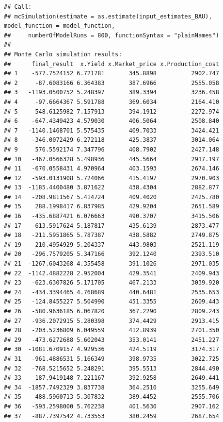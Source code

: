 \documentclass[
]{article}
\begin{document}
\begin{verbatim}
## Call:
## mcSimulation(estimate = as.estimate(input_estimates_BAU), model_function = model_function, 
##     numberOfModelRuns = 800, functionSyntax = "plainNames")
## 
## Monte Carlo simulation results:
##      final_result  x.Yield x.Market_price x.Production_cost
## 1    -577.7524152 6.721781       345.8898          2902.747
## 2     -87.6083166 6.364383       387.6966          2555.058
## 3   -1193.0500752 5.248397       389.3394          3236.458
## 4     -97.6664367 5.591788       369.6034          2164.410
## 5     548.6125982 7.157913       394.1912          2272.974
## 6    -647.4349423 4.579030       406.5064          2508.840
## 7   -1140.1468701 5.575435       409.7033          3424.421
## 8    -346.0072429 6.272118       425.3837          3014.064
## 9     576.5592174 7.347796       408.7902          2427.148
## 10   -467.0566328 5.498936       445.5664          2917.197
## 11   -670.0558431 4.970964       403.1593          2674.146
## 12   -593.0131908 5.724066       415.4197          2970.903
## 13  -1185.4400480 3.871622       438.4304          2882.877
## 14   -208.9811567 5.414724       409.4020          2425.780
## 15    288.1998417 6.837985       429.9204          2651.589
## 16   -435.6887421 6.076663       490.3707          3415.506
## 17   -613.5917624 5.187817       435.6139          2873.477
## 18   -211.5951865 5.787387       438.5882          2749.875
## 19   -210.4954929 5.204337       443.9803          2521.119
## 20   -296.7579205 5.347166       392.1240          2393.510
## 21  -1267.6043268 4.355458       391.1026          2971.035
## 22  -1142.4882228 2.952004       429.3541          2409.943
## 23   -623.6307826 5.171705       467.2133          3039.920
## 24   -434.3394465 4.768689       440.6481          2535.653
## 25   -124.8455227 5.504990       451.3355          2609.443
## 26   -580.9636185 6.067820       367.2290          2809.243
## 27   -936.2072915 5.280398       374.4429          2913.415
## 28   -203.5236809 6.049559       412.8939          2701.350
## 29   -473.6272688 5.602043       353.0141          2451.227
## 30  -1081.6709157 4.929536       424.5119          3174.317
## 31   -961.4886531 5.166349       398.9735          3022.725
## 32   -768.5215652 5.248291       395.5513          2844.490
## 33    187.9419148 7.221167       392.9258          2649.441
## 34  -1857.7492329 3.837738       364.2510          3255.649
## 35   -488.5960713 5.307832       389.4452          2555.706
## 36   -593.2598000 5.762238       401.5630          2907.162
## 37   -887.7397542 4.733553       380.2459          2687.654

\end{verbatim}
\end{document}
